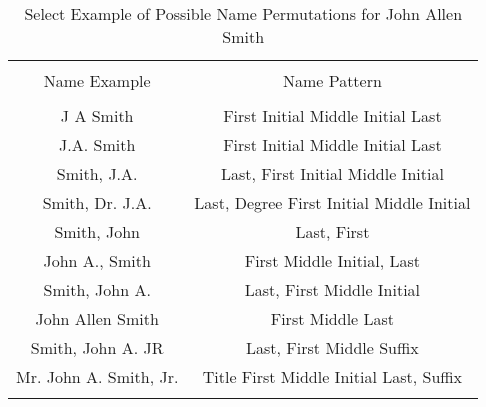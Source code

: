 
\begin{table}[!htbp] \centering 
  \caption{Select Example of Possible Name Permutations for John Allen Smith} 
  \label{} 
\footnotesize 
\begin{tabular}{@{\extracolsep{5pt}} cc} 
\\[-1.8ex]\hline 
\hline \\[-1.8ex] 
Name Example & Name Pattern \\ 
\hline \\[-1.8ex] 
J A Smith & First Initial Middle Initial Last \\ 
J.A. Smith & First Initial Middle Initial Last \\ 
Smith, J.A. & Last, First Initial Middle Initial \\ 
Smith, Dr. J.A. & Last, Degree First Initial Middle Initial \\ 
Smith, John & Last, First \\ 
John A., Smith & First Middle Initial, Last \\ 
Smith, John A. & Last, First Middle Initial \\ 
John Allen Smith & First Middle Last \\ 
Smith, John A. JR & Last, First Middle Suffix \\ 
Mr. John A. Smith, Jr. & Title First Middle Initial Last, Suffix \\ 
\hline \\[-1.8ex] 
\end{tabular} 
\end{table}  

